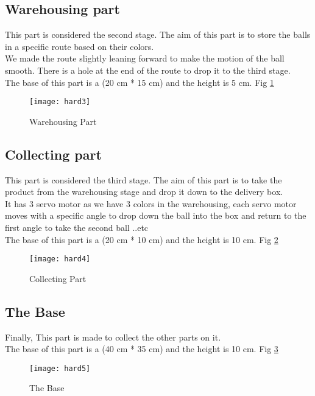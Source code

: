 \subsection{Warehousing part}
This part is considered the second stage. The aim of this part is to store the balls in a specific route
based on their colors.\\
We made the route slightly leaning forward to make the motion of the ball smooth.
There is a hole at the end of the route to drop it to the third stage.\\
The base of this part is a (20 cm * 15 cm) and the height is 5 cm. Fig \ref{fig:hard3}

\begin{figure}[h]
    \texttt{[image: hard3]}
    \centering
    \caption{Warehousing Part}
    \label{fig:hard3}
\end{figure}

\subsection{Collecting part}
This part is considered the third stage. The aim of this part is to take the product from the warehousing
stage and drop it down to the delivery box.\\
It has 3 servo motor as we have 3 colors in the warehousing, each servo motor moves with a specific
angle to drop down the ball into the box and return to the first angle to take the second ball ..etc\\
The base of this part is a (20 cm * 10 cm) and the height is 10 cm. Fig \ref{fig:hard4}

\begin{figure}[h]
    \texttt{[image: hard4]}
    \centering
    \caption{Collecting Part}
    \label{fig:hard4}
\end{figure}

\subsection{The Base}
Finally, This part is made to collect the other parts on it.\\
The base of this part is a (40 cm * 35 cm) and the height is 10 cm. Fig \ref{fig:hard5}

\begin{figure}[h]
    \texttt{[image: hard5]}
    \centering
    \caption{The Base}
    \label{fig:hard5}
\end{figure}

